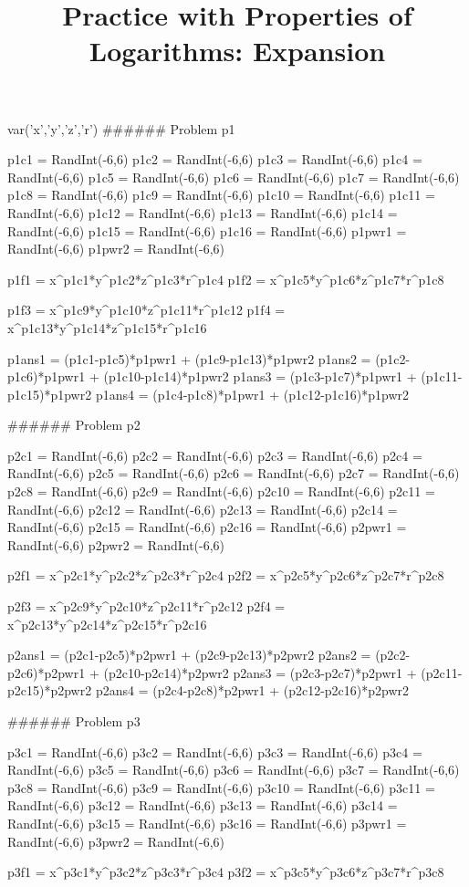\documentclass{ximera}
\title{Practice with Properties of Logarithms: Expansion}
\begin{document}


\begin{sagesilent}
var('x','y','z','r')
###### Problem p1

p1c1 = RandInt(-6,6)
p1c2 = RandInt(-6,6)
p1c3 = RandInt(-6,6)
p1c4 = RandInt(-6,6)
p1c5 = RandInt(-6,6)
p1c6 = RandInt(-6,6)
p1c7 = RandInt(-6,6)
p1c8 = RandInt(-6,6)
p1c9 = RandInt(-6,6)
p1c10 = RandInt(-6,6)
p1c11 = RandInt(-6,6)
p1c12 = RandInt(-6,6)
p1c13 = RandInt(-6,6)
p1c14 = RandInt(-6,6)
p1c15 = RandInt(-6,6)
p1c16 = RandInt(-6,6)
p1pwr1 = RandInt(-6,6)
p1pwr2 = RandInt(-6,6)

p1f1 = x^p1c1*y^p1c2*z^p1c3*r^p1c4
p1f2 = x^p1c5*y^p1c6*z^p1c7*r^p1c8

p1f3 = x^p1c9*y^p1c10*z^p1c11*r^p1c12
p1f4 = x^p1c13*y^p1c14*z^p1c15*r^p1c16

p1ans1 = (p1c1-p1c5)*p1pwr1 + (p1c9-p1c13)*p1pwr2
p1ans2 = (p1c2-p1c6)*p1pwr1 + (p1c10-p1c14)*p1pwr2
p1ans3 = (p1c3-p1c7)*p1pwr1 + (p1c11-p1c15)*p1pwr2
p1ans4 = (p1c4-p1c8)*p1pwr1 + (p1c12-p1c16)*p1pwr2


###### Problem p2

p2c1 = RandInt(-6,6)
p2c2 = RandInt(-6,6)
p2c3 = RandInt(-6,6)
p2c4 = RandInt(-6,6)
p2c5 = RandInt(-6,6)
p2c6 = RandInt(-6,6)
p2c7 = RandInt(-6,6)
p2c8 = RandInt(-6,6)
p2c9 = RandInt(-6,6)
p2c10 = RandInt(-6,6)
p2c11 = RandInt(-6,6)
p2c12 = RandInt(-6,6)
p2c13 = RandInt(-6,6)
p2c14 = RandInt(-6,6)
p2c15 = RandInt(-6,6)
p2c16 = RandInt(-6,6)
p2pwr1 = RandInt(-6,6)
p2pwr2 = RandInt(-6,6)

p2f1 = x^p2c1*y^p2c2*z^p2c3*r^p2c4
p2f2 = x^p2c5*y^p2c6*z^p2c7*r^p2c8

p2f3 = x^p2c9*y^p2c10*z^p2c11*r^p2c12
p2f4 = x^p2c13*y^p2c14*z^p2c15*r^p2c16

p2ans1 = (p2c1-p2c5)*p2pwr1 + (p2c9-p2c13)*p2pwr2
p2ans2 = (p2c2-p2c6)*p2pwr1 + (p2c10-p2c14)*p2pwr2
p2ans3 = (p2c3-p2c7)*p2pwr1 + (p2c11-p2c15)*p2pwr2
p2ans4 = (p2c4-p2c8)*p2pwr1 + (p2c12-p2c16)*p2pwr2


###### Problem p3

p3c1 = RandInt(-6,6)
p3c2 = RandInt(-6,6)
p3c3 = RandInt(-6,6)
p3c4 = RandInt(-6,6)
p3c5 = RandInt(-6,6)
p3c6 = RandInt(-6,6)
p3c7 = RandInt(-6,6)
p3c8 = RandInt(-6,6)
p3c9 = RandInt(-6,6)
p3c10 = RandInt(-6,6)
p3c11 = RandInt(-6,6)
p3c12 = RandInt(-6,6)
p3c13 = RandInt(-6,6)
p3c14 = RandInt(-6,6)
p3c15 = RandInt(-6,6)
p3c16 = RandInt(-6,6)
p3pwr1 = RandInt(-6,6)
p3pwr2 = RandInt(-6,6)

p3f1 = x^p3c1*y^p3c2*z^p3c3*r^p3c4
p3f2 = x^p3c5*y^p3c6*z^p3c7*r^p3c8


\end{sagesilent}
\end{document}

